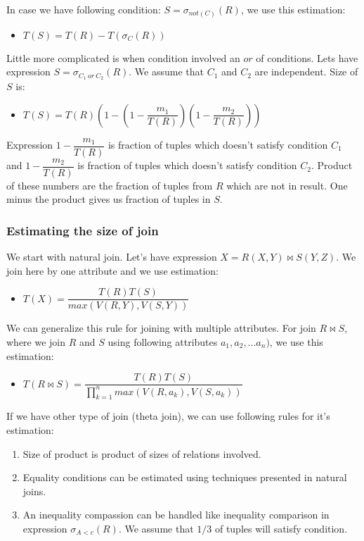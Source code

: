 In case we have following condition: $S=\sigma_{not(C)}(R)$, we use this estimation:
\begin{itemize}
\item $T(S)=T(R)-T(\sigma_C(R))$
\end{itemize}

Little more complicated is when condition involved an $or$ of conditions. Lets have expression $S=\sigma_{C_1~or~C_2}(R)$. We assume that $C_1$ and $C_2$ are independent. Size of $S$ is:

\begin{itemize}
\item $T(S)=T(R)(1-(1-\dfrac{m_1}{T(R)})(1-\dfrac{m_2}{T(R)}))$
\end{itemize}

Expression $1-\dfrac{m_1}{T(R)}$ is fraction of tuples which doesn't satisfy condition $C_1$ and $1-\dfrac{m_2}{T(R)}$ is fraction of tuples which doesn't satisfy condition $C_2$. Product of these numbers are the fraction of tuples from $R$ which are not in result. One minus the product gives us fraction of tuples in $S$.

\subsubsection{Estimating the size of join}
\label{join}
We start with natural join. Let's have expression $X=R(X,Y)\Join S(Y,Z)$. We join here by one attribute and we use estimation:

\begin{itemize}
\item $T(X)=\dfrac{T(R)T(S)}{max(V(R,Y),V(S,Y))}$
\end{itemize}

We can generalize this rule for joining with multiple attributes. For join $R\Join S$, where we join $R$ and $S$ using following attributes $a_1,a_2,...a_n)$, we use this estimation:

\begin{itemize}
\item $T(R\Join S)=\dfrac{T(R)T(S)}{\prod_{k=1}^{n}{max(V(R,a_k),V(S,a_k))}}$
\end{itemize}

 

If we have other type of join (theta join), we can use following rules for it's estimation:
\begin{enumerate}
\item Size of product is product of sizes of relations involved.
\item Equality conditions can be estimated using techniques presented in natural joins.
\item An inequality compassion can be handled like inequality comparison in expression $\sigma_{A<c}(R)$. We assume that $1/3$ of tuples will satisfy condition. 
\end{enumerate}

